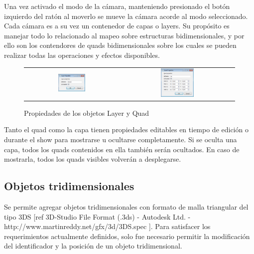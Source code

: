 Una vez activado el modo de la cámara, manteniendo presionado el botón izquierdo del ratón al moverlo se mueve la cámara acorde al modo seleccionado.
Cada cámara es a su vez un contenedor de capas o layers. Su propósito es manejar todo lo relacionado al mapeo sobre estructuras bidimensionales, y por ello son los contendores de quads bidimensionales sobre los cuales se pueden realizar todas las operaciones y efectos disponibles.

\begin{figure}
	\begin{center}
		\begin{tabular}[c]{cc}
			\includegraphics[width=0.3\textwidth]{./Cap5_vmt/vmt_layerProperties.png}
				&        
			\includegraphics[width=0.3\textwidth]{./Cap5_vmt/vmt_quadProperties.png}
		\end{tabular}
	\end{center}
	\caption{Propiedades de los objetos Layer y Quad}
	\label{fig:VMT-LayerQuadProperties}
\end{figure}

Tanto el quad como la capa tienen propiedades editables en tiempo de edición o durante el show para mostrarse u ocultarse completamente. Si se oculta una capa, todos los quads contenidos en ella también serán ocultados. En caso de mostrarla, todos los quads visibles volverán a desplegarse.

\subsection{Objetos tridimensionales}

Se permite agregar objetos tridimensionales con formato de malla triangular del tipo 3DS [ref 3D-Studio File Format (.3ds) - Autodesk Ltd. - http://www.martinreddy.net/gfx/3d/3DS.spec ]. Para satisfacer los requerimientos actualmente definidos, solo fue necesario permitir la modificación del identificador y la posición de un objeto tridimensional.

